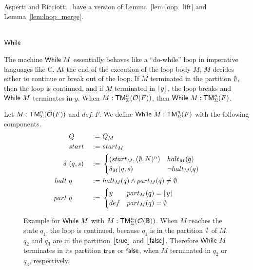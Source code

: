 Asperti and Ricciotti~\cite{asperti2015} have a version of Lemma~\ref{lem:loop_lift} and Lemma~\ref{lem:loop_merge}.

\section{$\mathsf{While}$}
\label{sec:While}
%

The machine $\mathsf{While}~M$ essentially behaves like a ``do-while'' loop in imperative languages like C.  At the end of the execution of the loop body $M$,
$M$ decides either to continue or break out of the loop.  If $M$ terminated in the partition $\emptyset$, then the loop is continued, and if $M$
terminated in $\left\lfloor {y} \right\rfloor$, the loop breaks and $\mathsf{While}~M$ terminates in $y$.  When $M : \mathsf{TM}_\Sigma^n(\mathcal{O}(F))$, then $\mathsf{While}~M : \mathsf{TM}_\Sigma^n(F)$.

\begin{definition}[$\MS{While}~M$][While]
  \label{def:While}
  Let $M : \mathsf{TM}_\Sigma^n(\mathcal{O}(F))$ and $def:F$.  We define $\mathsf{While}~M : \mathsf{TM}_\Sigma^n(F)$ with the following components.
  \begin{alignat*}{3}
    & Q              &~:=~& Q_M \\
    & start          &~:=~& start_M \\
    \delta ~& (q, s) &~:=~&
    \begin{cases}
      (start_M, (\emptyset, N)^n) & halt_M(q) \\
      \delta_M (q,s)    & \lnot halt_M(q)
    \end{cases} \\
    halt ~& q      &~:=~& halt_M(q) \land part_M(q) \neq \emptyset \\
    part ~& q      &~:=~&
    \begin{cases}
      y   & part_M(q) = \left\lfloor {y} \right\rfloor \\
      def & part_M(q) = \emptyset
    \end{cases}
  \end{alignat*}
\end{definition}

\begin{figure}
  \center
  
  \caption{Example for $\mathsf{While}~M$ with $M:\mathsf{TM}_\Sigma^n(\mathcal{O}(\mathbb{B}))$.  When $M$ reaches the state $q_1$, the loop is continued, because $q_1$ is in
    the partition $\emptyset$ of $M$.  $q_2$ and $q_3$ are in the partition $\left\lfloor {\ensuremath{\mathsf{true}}} \right\rfloor$ and $\left\lfloor {\ensuremath{\mathsf{false}}} \right\rfloor$.  Therefore $\mathsf{While}~M$ terminates in its
    partition $\mathsf{true}$ or $\mathsf{false}$, when $M$ terminated in $q_2$ or $q_3$, respectively.}
  \label{fig:while-example}
\end{figure}

